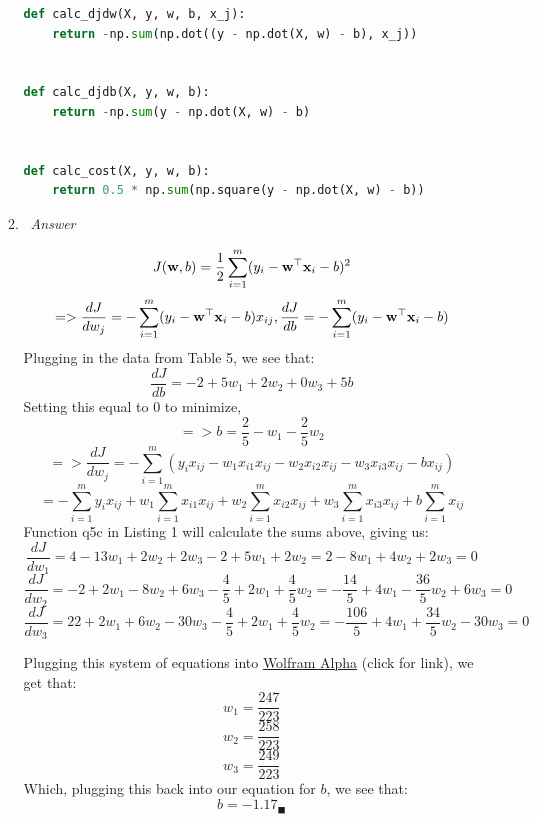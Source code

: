 \documentclass[12pt, fullpage,letterpaper]{article}
\begin{document}
\begin{enumerate}
\begin{enumerate}
\begin{lstlisting}[language=Python, caption=QuestionAnswers.part1]
def calc_djdw(X, y, w, b, x_j):
    return -np.sum(np.dot((y - np.dot(X, w) - b), x_j))


def calc_djdb(X, y, w, b):
    return -np.sum(y - np.dot(X, w) - b)


def calc_cost(X, y, w, b):
    return 0.5 * np.sum(np.square(y - np.dot(X, w) - b))


	\end{lstlisting}
	
	\item~\emph{Answer}
	
	\[
	    J({\bf w}, b) = \frac{1}{2} \sum_{i=1}^m (y_i - {\bf w}^\top {\bf x}_i - b)^2
	\]
	\[
        => \frac{dJ}{dw_j} = -\sum_{i=1}^m (y_i - {\bf w}^\top {\bf x}_i - b)x_{ij},  \frac{dJ}{db} = -\sum_{i=1}^m (y_i - {\bf w}^\top {\bf x}_i - b)
    \]
    Plugging in the data from Table 5, we see that:
    \[
       \frac{dJ}{db} = -2 + 5w_1 +2 w_2 + 0w_3 + 5b
    \]
    Setting this equal to 0 to minimize,
    \[
        => b = \frac{2}{5} - w_1 - \frac{2}{5}w_2
    \]
    \[
        => \frac{dJ}{dw_j} = -\sum_{i=1}^m (y_i x_{ij} - w_1 x_{i1} x_{ij} - w_2 x_{i2} x_{ij} - w_3 x_{i3} x_{ij} - b x_{ij})
    \]
    \[
        = -\sum_{i=1}^m y_i x_{ij} + w_1\sum_{i=1}^m x_{i1} x_{ij} + w_2\sum_{i=1}^m x_{i2} x_{ij} + w_3\sum_{i=1}^m x_{i3} x_{ij} + b\sum_{i=1}^m x_{ij}
    \]
    Function q5c in Listing 1 will calculate the sums above, giving us:
    \[
        \frac{dJ}{dw_1} = 4 - 13w_1 + 2w_2 + 2w_3 - 2 + 5w_1 + 2w_2 = 2 - 8w_1 + 4w_2 + 2w_3 = 0
    \]
    \[
        \frac{dJ}{dw_2} = -2 + 2w_1 - 8w_2 + 6w_3 - \frac{4}{5} + 2w_1 + \frac{4}{5}w_2 = -\frac{14}{5} + 4w_1 - \frac{36}{5}w_2 + 6w_3 = 0
    \]
    \[
        \frac{dJ}{dw_3} = 22 + 2w_1 + 6w_2 - 30w_3 - \frac{4}{5} + 2w_1 + \frac{4}{5}w_2 = -\frac{106}{5} + 4w_1 + \frac{34}{5}w_2 - 30w_3 = 0
    \]
    
    Plugging this system of equations into \href{https://www.wolframalpha.com/input/?i=systems+of+equations+calculator&assumption=%7B%22F%22%2C+%22SolveSystemOf3EquationsCalculator%22%2C+%22equation1%22%7D+-%3E%222-8a%2B4b%2B2c%22&assumption=%22FSelect%22+-%3E+%7B%7B%22SolveSystemOf3EquationsCalculator%22%7D%7D&assumption=%7B%22F%22%2C+%22SolveSystemOf3EquationsCalculator%22%2C+%22equation2%22%7D+-%3E%22-14%2F5%2B4a-36%2F5b%2B6c%22&assumption=%7B%22F%22%2C+%22SolveSystemOf3EquationsCalculator%22%2C+%22equation3%22%7D+-%3E%22106%2F5%2B4a%2B34%2F5b-30c%22}{Wolfram Alpha} (click for link), we get that:
    \[
        w_1 = \frac{247}{223}
    \]
    \[
        w_2 = \frac{258}{223}
    \]
    \[
        w_3 = \frac{249}{223}
    \]
    Which, plugging this back into our equation for $b$, we see that:
    \[
        b = -1.17_\blacksquare
    \]
	

\end{enumerate}
\end{enumerate}
\end{document}
